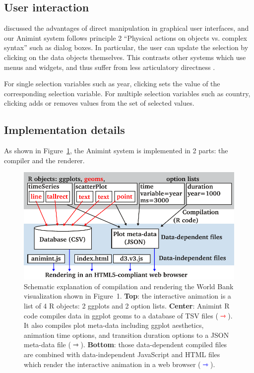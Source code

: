 \documentclass[10pt,journal,compsoc]{IEEEtran}\usepackage[]{graphicx}\usepackage[]{color}
\begin{document}
\subsection{User interaction}

\citet{instrumental-interaction} discussed the advantages of direct
manipulation in graphical user interfaces, and our Animint system
follows principle 2 ``Physical actions on objects vs. complex syntax''
such as dialog boxes. In particular, the user can update the selection
by clicking on the data objects themselves. This contrasts other
systems which use menus and widgets, and thus suffer from less
articulatory directness \citep{Hutchins:1985}.

For single selection variables such as year, clicking sets the value
of the corresponding selection variable. For multiple selection
variables such as country, clicking adds or removes values from the
set of selected values.


\subsection{Implementation details}
\label{sec:implementation}

As shown in Figure~\ref{fig:design}, the Animint system is implemented
in 2 parts: the compiler and the renderer.

\begin{figure}[b!]
  \centering
  \includegraphics[width=\columnwidth]{figure-design}
  \caption{Schematic explanation of compilation and rendering the
    World Bank visualization shown in Figure~1. \textbf{Top}: the
    interactive animation is a list of 4 R objects: 2 ggplots and 2
    option lists. \textbf{Center}: Animint R code compiles data in
    ggplot geoms to a database of TSV files
    (\textcolor{red}{$\rightarrowtriangle$}). It also compiles plot
    meta-data including ggplot aesthetics, animation time
    options, and transition duration options to a JSON meta-data file
    ($\rightarrowtriangle$). \textbf{Bottom}: those data-dependent
    compiled files are combined with data-independent JavaScript and
    HTML files which render the interactive animation in a web browser
    (\textcolor{blue}{$\rightarrowtriangle$}).}
  \label{fig:design}
\end{figure}
\end{document}
